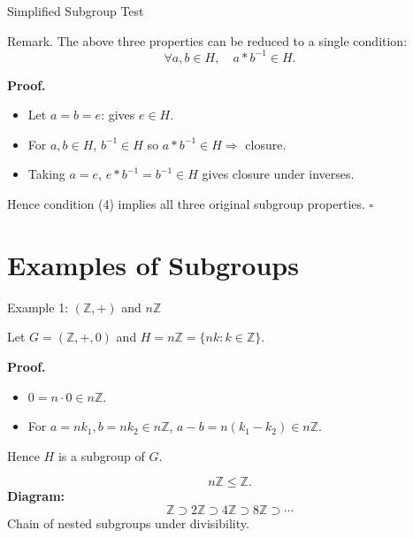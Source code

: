 \begin{frame}{Simplified Subgroup Test}
\begin{block}{Remark.}
The above three properties can be reduced to a single condition:
\[
\forall a,b \in H,\quad a * b^{-1} \in H.
\]

\textbf{Proof.}
\begin{itemize}
  \item Let \(a=b=e\): gives \(e\in H\).
  \item For \(a,b\in H\), \(b^{-1}\in H\) so \(a*b^{-1}\in H \Rightarrow\) closure.
  \item Taking \(a=e\), \(e*b^{-1}=b^{-1}\in H\) gives closure under inverses.
\end{itemize}

Hence condition (4) implies all three original subgroup properties. \(\square\)
\end{block}
\end{frame}

\section{Examples of Subgroups}

\begin{frame}{Example 1: $(\mathbb{Z}, +)$ and $n\mathbb{Z}$}
\begin{block}{}
    Let \(G=(\mathbb{Z}, +, 0)\) and \(H = n\mathbb{Z} = \{nk : k\in \mathbb{Z}\}.\)

\textbf{Proof.}
\begin{itemize}
  \item \(0 = n\cdot 0 \in n\mathbb{Z}\).
  \item For \(a=nk_1, b=nk_2 \in n\mathbb{Z}\), \(a-b = n(k_1-k_2)\in n\mathbb{Z}\).
\end{itemize}
Hence \(H\) is a subgroup of \(G.\)

\[
n\mathbb{Z} \le \mathbb{Z}.
\]
\textbf{Diagram:}
\[
\mathbb{Z} \supset 2\mathbb{Z} \supset 4\mathbb{Z} \supset 8\mathbb{Z} \supset \cdots
\]
Chain of nested subgroups under divisibility.
\end{block}

\end{frame}

